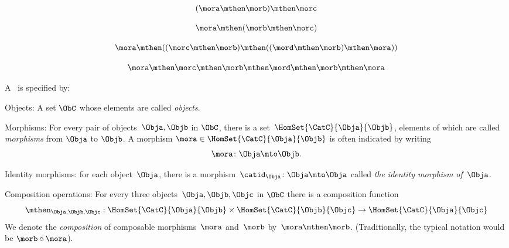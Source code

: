 {\begin{forslides}
		\begin{equation}
			\label{eq:11}
			(\mora \mthen \morb) \mthen \morc
		\end{equation}

		\begin{equation}
			\label{eq:12}
			\mora \mthen  (\morb \mthen \morc )
		\end{equation}

		\begin{equation}
			\label{eq:13}
			\mora \mthen  ((\morc \mthen \morb ) \mthen (( \mord \mthen \morb ) \mthen \mora ))
		\end{equation}

		\begin{equation}
			\label{eq:14}
			\mora \mthen  \morc \mthen \morb  \mthen \mord \mthen \morb  \mthen \mora
		\end{equation}

		\begin{ctdefinition}
			\label{def:category-var}
			A \emph{}~\CatC is specified by:
			\begin{body}
				\constit
				\begin{compactenum}
					\item Objects: A set $\ObC$ whose elements are called \emph{objects}.
					\item Morphisms: For every pair of objects~$\Obja,\Objb$ in $\ObC$, there is a set~$\HomSet{\CatC}{\Obja}{\Objb}$, elements of which are called \emph{morphisms} from $\Obja$ to $\Objb$.
					A morphism $\mora \in \HomSet{\CatC}{\Obja}{\Objb}$ is often indicated by writing
					\begin{equation*}
						\mora \colon \Obja \mto \Objb.
					\end{equation*}
					\item Identity morphisms: for each object~$\Obja$, there is a morphism~$\catid_{\Obja}\colon \Obja \mto \Obja$  called \emph{the identity morphism of~$\Obja$}.
					\item Composition operations: For every three objects~$\Obja,\Objb,\Objc$ in $\ObC$ there is a composition function
					\begin{equation*}
						\mthen_{\Obja,\Objb,\Objc}: \HomSet{\CatC}{\Obja}{\Objb} \times \HomSet{\CatC}{\Objb}{\Objc}\to \HomSet{\CatC}{\Obja}{\Objc}
					\end{equation*}
					We denote the \emph{composition} of composable morphisms~$\mora$ and~$\morb$ by~$\mora \mthen \morb$. (Traditionally, the typical notation would be $\morb \circ \mora$).


\end{compactenum}
\end{body}
\end{ctdefinition}
\end{forslides}}
